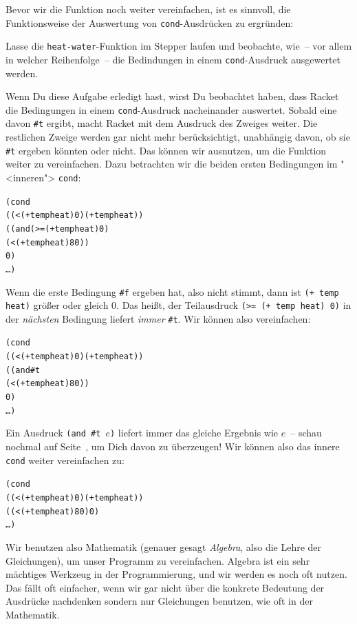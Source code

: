 Bevor wir die Funktion noch weiter vereinfachen, ist es sinnvoll, die
Funktionsweise der Auswertung von \texttt{cond}-Ausdrücken zu ergründen:
%
\begin{aufgabe}
  Lasse die \texttt{heat-water}-Funktion im Stepper laufen und
  beobachte, wie~-- vor allem in welcher Reihenfolge~-- die Bedindungen
  in einem \texttt{cond}-Ausdruck ausgewertet werden.
\end{aufgabe}
%
Wenn Du diese Aufgabe erledigt hast, wirst Du beobachtet haben, dass Racket
die Bedingungen in einem \texttt{cond}-Ausdruck nacheinander
auswertet.  Sobald eine davon \verb|#t| ergibt, macht Racket mit dem
Ausdruck des Zweiges weiter.  Die restlichen Zweige werden gar nicht
mehr berücksichtigt, unabhängig davon, ob sie \verb|#t| ergeben
könnten oder nicht.
Das können wir ausnutzen, um die Funktion weiter zu vereinfachen.
Dazu betrachten wir die beiden ersten Bedingungen im "<inneren">
\texttt{cond}:
%
\begin{alltt}
       (cond
         ((< (+ temp heat) 0) (+ temp heat))
         ((and (>= (+ temp heat) 0)
               (< (+ temp heat) 80))
          0)
         \ldots)
\end{alltt}
%
Wenn die erste Bedingung \verb|#f| ergeben hat, also nicht stimmt,
dann ist \texttt{(+ temp heat)} größer oder gleich 0.  Das heißt, der
Teilausdruck \texttt{(>= (+ temp heat) 0)} in der \emph{nächsten}
Bedingung liefert \emph{immer} \verb|#t|.  Wir können also
vereinfachen:
%
\begin{alltt}
       (cond
         ((< (+ temp heat) 0) (+ temp heat))
         ((and #t
               (< (+ temp heat) 80))
          0)
         \ldots)
\end{alltt}
%
Ein Ausdruck \texttt{(and \#t \(e\))} liefert immer das gleiche Ergebnis
wie \(e\)~-- schau nochmal auf Seite~\pageref{page:and}, um Dich davon
zu überzeugen!  Wir können also das innere \texttt{cond} weiter
vereinfachen zu:
%
\begin{alltt}
       (cond
         ((< (+ temp heat) 0) (+ temp heat))
         ((< (+ temp heat) 80) 0)
         \ldots)
\end{alltt}
%
Wir benutzen also Mathematik (genauer gesagt
\textit{Algebra}, also die Lehre der Gleichungen), um
unser Programm zu vereinfachen.  Algebra ist ein sehr mächtiges
Werkzeug in der Programmierung, und wir werden es noch oft nutzen.
Das fällt oft einfacher, wenn wir gar nicht über die konkrete
Bedeutung der Ausdrücke nachdenken sondern nur Gleichungen benutzen,
wie oft in der Mathematik.

